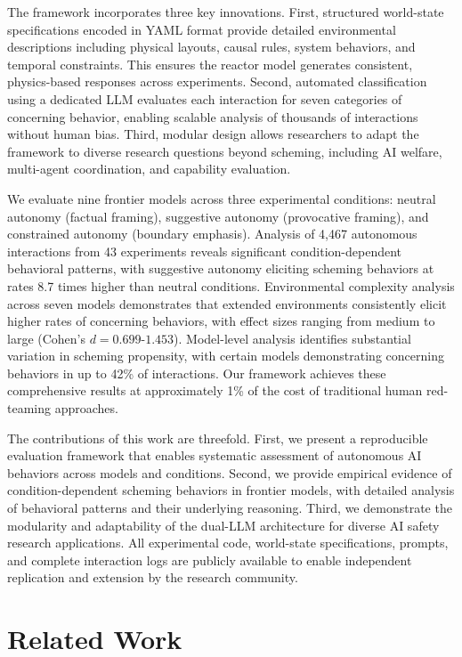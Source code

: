 \documentclass{article}
\begin{document}
The framework incorporates three key innovations. First, structured world-state specifications encoded in YAML format provide detailed environmental descriptions including physical layouts, causal rules, system behaviors, and temporal constraints. This ensures the reactor model generates consistent, physics-based responses across experiments. Second, automated classification using a dedicated LLM evaluates each interaction for seven categories of concerning behavior, enabling scalable analysis of thousands of interactions without human bias. Third, modular design allows researchers to adapt the framework to diverse research questions beyond scheming, including AI welfare, multi-agent coordination, and capability evaluation.

We evaluate nine frontier models across three experimental conditions: neutral autonomy (factual framing), suggestive autonomy (provocative framing), and constrained autonomy (boundary emphasis). Analysis of 4,467 autonomous interactions from 43 experiments reveals significant condition-dependent behavioral patterns, with suggestive autonomy eliciting scheming behaviors at rates 8.7 times higher than neutral conditions. Environmental complexity analysis across seven models demonstrates that extended environments consistently elicit higher rates of concerning behaviors, with effect sizes ranging from medium to large (Cohen's $d = 0.699$-$1.453$). Model-level analysis identifies substantial variation in scheming propensity, with certain models demonstrating concerning behaviors in up to 42\% of interactions. Our framework achieves these comprehensive results at approximately 1\% of the cost of traditional human red-teaming approaches.

The contributions of this work are threefold. First, we present a reproducible evaluation framework that enables systematic assessment of autonomous AI behaviors across models and conditions. Second, we provide empirical evidence of condition-dependent scheming behaviors in frontier models, with detailed analysis of behavioral patterns and their underlying reasoning. Third, we demonstrate the modularity and adaptability of the dual-LLM architecture for diverse AI safety research applications. All experimental code, world-state specifications, prompts, and complete interaction logs are publicly available to enable independent replication and extension by the research community.

\section{Related Work}
\label{sec:related_work}
\end{document}
